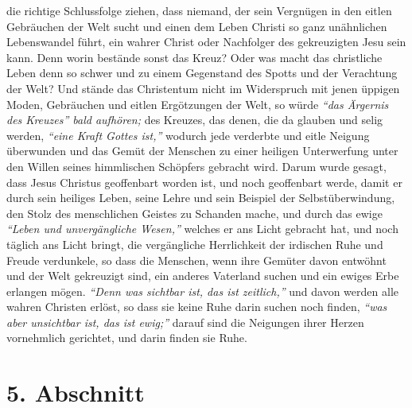 die richtige Schlussfolge ziehen, dass niemand, der sein Vergnügen in den eitlen
Gebräuchen der Welt sucht und einen dem Leben Christi so ganz unähnlichen
Lebenswandel führt, ein wahrer Christ oder Nachfolger des gekreuzigten Jesu sein
kann. Denn worin bestände sonst das Kreuz? Oder was macht das christliche
Leben denn so schwer und zu einem Gegenstand des Spotts und der Verachtung der
Welt? Und stände das Christentum nicht im Widerspruch mit jenen üppigen Moden,
Gebräuchen und eitlen Ergötzungen der Welt, so würde
\textit{"`das Ärgernis des Kreuzes"' bald aufhören;}
des Kreuzes, das denen, die da glauben und
selig werden,
\textit{"`eine Kraft Gottes ist,"'}
wodurch jede
verderbte und eitle Neigung überwunden und das Gemüt der Menschen zu einer
heiligen Unterwerfung unter den Willen seines himmlischen Schöpfers gebracht
wird. Darum wurde gesagt, dass Jesus Christus geoffenbart worden ist, und noch
geoffenbart werde, damit er durch sein heiliges Leben, seine Lehre und sein
Beispiel der Selbstüberwindung, den Stolz des menschlichen Geistes zu Schanden
mache,
und durch das ewige \textit{"`Leben und unvergängliche
Wesen,"'} welches er ans Licht gebracht hat, und noch täglich ans
Licht bringt,
die vergängliche Herrlichkeit der irdischen Ruhe und Freude
verdunkele,
so dass die Menschen, wenn ihre
Gemüter davon entwöhnt und der Welt gekreuzigt sind, ein anderes Vaterland
suchen und ein ewiges Erbe erlangen mögen.
\textit{"`Denn was sichtbar ist, das ist zeitlich,"'}
und davon werden alle wahren Christen erlöst,
so dass sie keine Ruhe darin suchen noch finden,
\textit{"`was aber unsichtbar ist, das
ist ewig;"'} darauf sind die Neigungen ihrer Herzen vornehmlich gerichtet, und
darin finden sie Ruhe.

\section{5. Abschnitt} \label{kap16_ab5}

